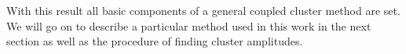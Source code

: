 With this result all basic components of a 
general coupled cluster method are set. We will go on to describe a 
particular method used in this work in the next section as well as the procedure 
of finding cluster amplitudes.

%
%

